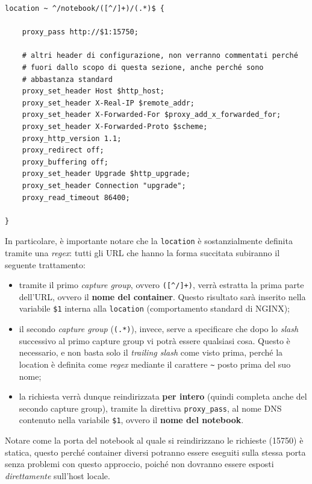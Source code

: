 \begin{verbatim}
location ~ ^/notebook/([^/]+)/(.*)$ { 
                
    proxy_pass http://$1:15750;

    # altri header di configurazione, non verranno commentati perché
    # fuori dallo scopo di questa sezione, anche perché sono
    # abbastanza standard
    proxy_set_header Host $http_host;
    proxy_set_header X-Real-IP $remote_addr;
    proxy_set_header X-Forwarded-For $proxy_add_x_forwarded_for;
    proxy_set_header X-Forwarded-Proto $scheme;
    proxy_http_version 1.1;
    proxy_redirect off;
    proxy_buffering off;
    proxy_set_header Upgrade $http_upgrade;
    proxy_set_header Connection "upgrade";
    proxy_read_timeout 86400;

}
\end{verbatim}
In particolare, è importante notare che la \verb|location| è sostanzialmente definita tramite una \textit{regex}: tutti gli URL che hanno la forma succitata subiranno il seguente trattamento:
\begin{itemize}
    \item tramite il primo \textit{capture group}, ovvero \verb|([^/]+)|, verrà estratta la prima parte dell'URL, ovvero il \textbf{nome del container}. Questo risultato sarà inserito nella variabile \verb|$1| interna alla \verb|location| (comportamento standard di NGINX);
    \item il secondo \textit{capture group} (\verb|(.*)|), invece, serve a specificare che dopo lo \textit{slash} successivo al primo capture group vi potrà essere qualsiasi cosa. Questo è necessario, e non basta solo il \textit{trailing slash} come visto prima, perché la location è definita come \textit{regex} mediante il carattere \verb|~| posto prima del suo nome;
    \item la richiesta verrà dunque reindirizzata \textbf{per intero} (quindi completa anche del secondo capture group), tramite la direttiva \verb|proxy_pass|, al nome DNS contenuto nella variabile \verb|$1|, ovvero il \textbf{nome del notebook}.
\end{itemize}
Notare come la porta del notebook al quale si reindirizzano le richieste (15750) è statica, questo perché container diversi potranno essere eseguiti sulla stessa porta senza problemi con questo approccio, poiché non dovranno essere esposti \textit{direttamente} sull'host locale.

